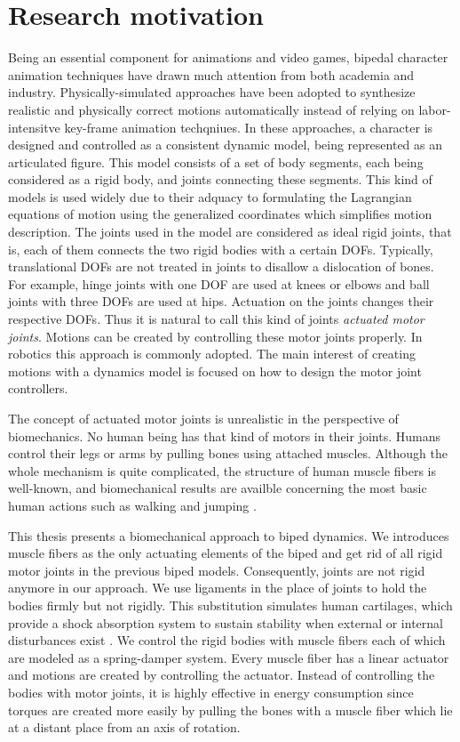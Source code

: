\documentclass[master,english,final]{kaist-ucs}
\begin{document}
\section{Research motivation}
Being an essential component for animations and video games,
bipedal character animation techniques have drawn much attention from
both academia and industry. Physically-simulated approaches have been
adopted to synthesize realistic and physically correct motions
automatically instead of relying on labor-intensitve key-frame animation
techqniues. In these approaches, a character is designed and controlled
as a consistent dynamic model, being represented as an articulated
figure. This model consists of a set of body segments, each being
considered as a rigid body, and joints connecting these segments.
This kind of models is used widely due to their adquacy to formulating
the Lagrangian equations of motion using the generalized coordinates
which simplifies motion description.
The joints used in the model are considered as ideal rigid joints,
that is, each of them connects the two rigid bodies with a certain DOFs.
Typically, translational DOFs are not treated in joints to disallow a dislocation of bones.
For example, hinge joints with one DOF are used at knees or elbows and
ball joints with three DOFs are used at hips. Actuation on the joints
changes their respective DOFs. Thus it is natural to call this kind of joints
\emph{actuated motor joints}. Motions can be created by
controlling these motor joints properly. In robotics this approach is
commonly adopted. The main interest of creating motions
with a dynamics model is focused on how to design the motor joint controllers.

The concept of actuated motor joints is unrealistic in the perspective of
biomechanics. No human being has that kind of motors in their joints.
Humans control their legs or arms by pulling bones using attached
muscles. Although the whole mechanism is quite complicated,
the structure of human muscle fibers is well-known, and biomechanical
results are availble concerning the most basic human actions
such as walking and jumping \cite{citeulike:2547705, citeulike:7093575}.

This thesis presents a biomechanical approach to biped dynamics. We
introduces muscle fibers as the only actuating elements
of the biped and get rid of all rigid motor joints in the previous biped
models. Consequently, joints are not rigid anymore in our approach.
We use ligaments in the place of joints
to hold the bodies firmly but not rigidly. This substitution
simulates human cartilages, which provide a shock absorption
system to sustain stability when external or internal disturbances exist \cite{shock}.
We control the rigid bodies with muscle fibers each of which are modeled as
a spring-damper system. Every muscle fiber has a linear actuator and
motions are created by controlling the actuator. Instead of controlling
the bodies with motor joints, it is highly effective in energy consumption
since torques are created more easily by pulling the bones with a muscle
fiber which lie at a distant place from an axis of rotation.
\end{document}
